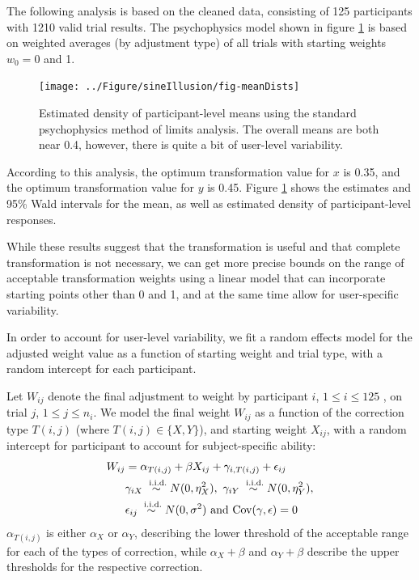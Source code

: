 \documentclass[11pt]{isuthesis}\usepackage[]{graphicx}\usepackage[]{color}
\newenvironment{knitrout}{}{} %
\begin{document}
The following analysis is based on the cleaned data, consisting of 125 participants with 1210 valid trial results. The psychophysics model shown in figure \ref{fig:psycho} is based on  weighted averages (by adjustment type) of all trials with starting weights $w_0 = 0$ and 1.


\begin{figure}\centering
\begin{knitrout}
\color{fgcolor}

{\centering \texttt{[image: ../Figure/sineIllusion/fig-meanDists]} 

}



\end{knitrout}

\caption[Results from psychophysics analysis]{Estimated density of participant-level means using the standard psychophysics method of limits analysis. The overall means are both near 0.4, however, there is quite a bit of user-level variability.\label{fig:psycho}}
\end{figure}




According to this analysis, the optimum transformation value for $x$ is 0.35, and the optimum transformation value for $y$ is 0.45. Figure \ref{fig:psycho} shows the estimates and 95\% Wald intervals for the mean, as well as estimated density of participant-level responses. 

While these results suggest that the transformation is useful and that complete transformation is not necessary, we can get more precise bounds on the range of acceptable transformation weights using a linear model that can incorporate starting points other than 0 and 1, and at the same time allow for user-specific variability.

In order to account for user-level variability, we fit a random effects model for the adjusted weight value as a function of  starting weight and trial type, with a random intercept for each participant. 

Let $W_{ij}$ denote the final adjustment to weight by participant $i$, $ 1 \le i \le 125$ , on trial $j$, $1 \le j \le n_i$. 
We model the final weight $W_{ij}$ as a function of the correction type $T(i,j)$  (where $T(i,j) \in  \{X, Y\}$), and starting weight $X_{ij}$, with a random intercept for participant to account for subject-specific ability: 
\begin{align}\label{model1}
W_{ij} &= \alpha_{T(i,j)} + \beta X_{ij} + \gamma_{i, T(i,j)} + \epsilon_{ij}\\
& \gamma_{iX} \stackrel{\text{ i.i.d.}}{\sim} N(0, \eta_X^2) , \ \gamma_{iY} \stackrel{\text{ i.i.d.}}{\sim} N(0, \eta_Y^2) ,\notag  \\
& \epsilon_{ij} \stackrel{\text{ i.i.d.}}{\sim} N(0, \sigma^2)  \text{ and } \text{Cov}(\gamma, \epsilon) = 0\notag 
\end{align}
 $\alpha_{T(i,j)}$ is either $\alpha_X$ or $\alpha_Y$, describing the lower threshold of the acceptable range for each of the types of correction, while $\alpha_X+\beta$ and $\alpha_Y + \beta$ describe the upper thresholds for the respective correction.
\end{document}
